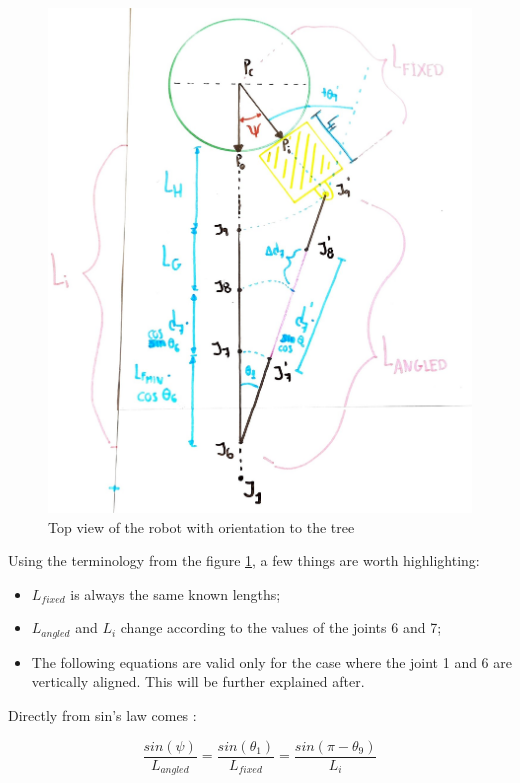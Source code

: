 \documentclass{report}
\begin{document}
\begin{figure}[H]
    \centering
    \includegraphics[scale=0.15]{resources/theta_9.jpeg}
    \caption{\label{fig:theta_9} Top view of the robot with orientation to the tree} 
\end{figure}

Using the terminology from the figure \ref{fig:theta_9}, a few things are worth highlighting:\begin{itemize}
    \item $L_{fixed}$ is always the same known lengths;
    \item $L_{angled}$ and $L_i$ change according to the values of the joints 6
    and 7;
    \item The following equations are valid only for the case where the joint 1
    and 6 are vertically aligned. This will be further explained after.
\end{itemize}

Directly from sin's law comes :

\begin{equation}
    \frac{sin(\psi)}{L_{angled}}=\frac{sin(\theta_1)}{L_{fixed}} =\frac{sin(\pi-\theta_9)}{L_i}
\end{equation}
\end{document}
